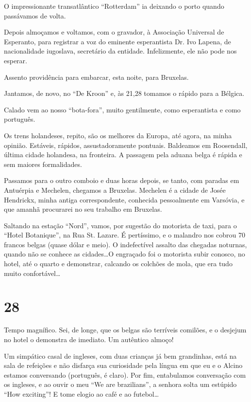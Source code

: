 O impressionante transatlântico ``Rotterdam'' ia deixando o porto quando passávamos de volta.

Depois almoçamos e voltamos, com o gravador, à Associação Universal de Esperanto, para registrar a voz do eminente esperantista Dr. Ivo Lapena, de nacionalidade iugoslava, secretário da entidade. Infelizmente, ele não pode nos esperar.

Assento providência para embarcar, esta noite, para Bruxelas.

Jantamos, de novo, no ``De Kroon'' e, às 21,28 tomamos o rápido para a Bélgica.

Calado vem ao nosso ``bota-fora'', muito gentilmente, como esperantista e como português.

Os trens holandeses, repito, são os melhores da Europa, até agora, na minha opinião. Estáveis, rápidos, assustadoramente pontuais. Baldeamos em Roosendall, última cidade holandesa, na fronteira. A passagem pela aduana belga é rápida e sem maiores formalidades.

Passamos para o outro comboio e duas horas depois, se tanto, com paradas em Antuérpia e Mechelen, chegamos a Bruxelas. Mechelen é a cidade de Josée Hendrickx, minha antiga correspondente, conhecida pessoalmente em Varsóvia, e que amanhã procurarei no seu trabalho em Bruxelas.

Saltando na estação ``Nord'', vamos, por sugestão do motorista de taxi, para o ``Hotel Botanique'', na Rua St. Lazare. É pertíssimo, e o malandro nos cobrou 70 francos belgas (quase dólar e meio). O indefectível assalto das chegadas noturnas, quando não se conhece as cidades\ldots O engraçado foi o motorista subir conosco, no hotel, até o quarto e demonstrar, calcando os colchões de mola, que era tudo muito confortável\ldots

\section*{28 \adfflatleafright {}}
Tempo magnífico. Sei, de longe, que os belgas são terríveis comilões, e o desjejum no hotel o demonstra de imediato. Um autêntico almoço!

Um simpático casal de ingleses, com duas crianças já bem grandinhas, está na sala de refeições e não disfarça sua curiosidade pela língua em que eu e o Alcino estamos conversando (português, é claro). Por fim, entabulamos conversação com os ingleses, e ao ouvir o meu ``We are brazilians'', a senhora solta um estúpido ``How exciting''! E tome elogio ao café e ao futebol\ldots

